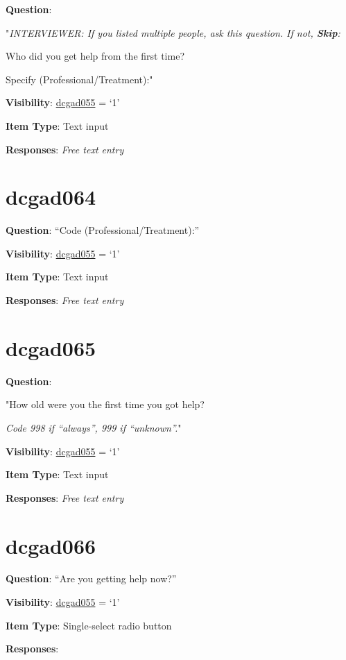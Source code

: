 \documentclass[]{book}
\begin{document}
\textbf{Question}:

"\emph{INTERVIEWER: If you listed multiple people, ask this question. If not, \textbf{Skip}:}

Who did you get help from the first time?

Specify (Professional/Treatment):"

\textbf{Visibility}: \protect\hyperlink{dcgad055}{dcgad055} = `1'

\textbf{Item Type}: Text input

\textbf{Responses}: \emph{Free text entry}

\hypertarget{dcgad064}{%
\section{dcgad064}\label{dcgad064}}

\textbf{Question}: ``Code (Professional/Treatment):''

\textbf{Visibility}: \protect\hyperlink{dcgad055}{dcgad055} = `1'

\textbf{Item Type}: Text input

\textbf{Responses}: \emph{Free text entry}

\hypertarget{dcgad065}{%
\section{dcgad065}\label{dcgad065}}

\textbf{Question}:

"How old were you the first time you got help?

\emph{Code 998 if ``always'', 999 if ``unknown''.}"

\textbf{Visibility}: \protect\hyperlink{dcgad055}{dcgad055} = `1'

\textbf{Item Type}: Text input

\textbf{Responses}: \emph{Free text entry}

\hypertarget{dcgad066}{%
\section{dcgad066}\label{dcgad066}}

\textbf{Question}: ``Are you getting help now?''

\textbf{Visibility}: \protect\hyperlink{dcgad055}{dcgad055} = `1'

\textbf{Item Type}: Single-select radio button

\textbf{Responses}:
\end{document}
